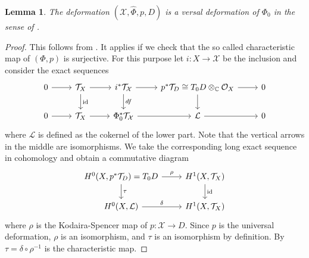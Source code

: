 \documentclass{amsart}
\theoremstyle{definition}
\theoremstyle{plain}
\newtheorem{lemma}[definition]{Lemma}
\DeclareMathOperator{\id}{id}
\newcommand{\CC}{\mathbb{C}}
\renewcommand{\O}{\mathcal{O}}
\newcommand{\X}{\mathcal{X}}
\newcommand{\T}{\mathcal{T}}
\renewcommand{\L}{\mathcal{L}}
\begin{document}
\begin{lemma}
 The deformation $(\X,\hat{\Phi},p,D)$ is a versal deformation of $\Phi_0$ in the sense of \cite[Def.\ 1.2]{horikawa:I}.
\end{lemma}
\begin{proof}
This follows from \cite[Thm.\ 2.1]{horikawa:I}. It applies if we check that the so called characteristic map of $(\Phi,p)$ is surjective.
For this purpose let $i\colon X \rightarrow \X$ be the inclusion and consider the exact sequences
\begin{equation*}
\begin{tikzcd}
 0 \arrow[r," "] & \T_X \arrow[r,""]\arrow[d,"\id"]& i^*\T_{\X} \arrow[d,"df"] \arrow[r]& p^*\T_D \cong T_0D \otimes_\CC \O_X  \arrow[r] \arrow[d,""] &0 \\
 0 \arrow[r," "] & \T_X \arrow[r,""]& \Phi_0^*\T_{\X} \arrow[r]& \L \arrow[r] & 0
\end{tikzcd}
\end{equation*}
where $\L$ is defined as the cokernel of the lower part. Note that the vertical arrows in the middle are isomorphisms.
We take the corresponding long exact sequence in cohomology and obtain a commutative diagram
\begin{equation*}
\begin{tikzcd}
 H^0(X,p^*\T_D) = T_0 D \arrow[r,"\rho"] \arrow[d,"\tau"]& H^1(X,\T_X) \arrow[d,"\id"]\\
 H^0(X,\L)\arrow[r,"\delta "] & H^1(X,\T_X)
\end{tikzcd}
\end{equation*}
where $\rho$ is the Kodaira-Spencer map of
$p\colon \X \rightarrow D$. Since $p$ is the universal
deformation, $\rho$ is an isomorphism, and $\tau$ is an
isomorphism by definition.
By \cite[Prop.\ 1.4]{horikawa:I} $\tau = \delta \circ \rho^{-1}$ is the characteristic map.
\end{proof}
\end{document}
